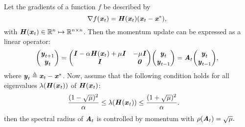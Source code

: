 \begin{lemma}
\label{lem:robustness_general}
Let the gradients of a function $f$ be described by
\begin{equation}
	\nabla f(\bm{\mathit{x}}_t) = \bm{\mathit{H}}(\bm{\mathit{x}}_t) (\bm{\mathit{x}}_t - \bm{\mathit{x}}^*),
\end{equation}
with $\bm{\mathit{H}}(\bm{x}_t) \in \mathbb{R}^n \mapsto \mathbb{R}^{n\times n}$.
Then the momentum update can be expressed as a linear operator:
\begin{align}
{\begin{pmatrix}
\bm{\mathit{y}}_{t+1}\\
\bm{\mathit{y}}_t \\
\end{pmatrix}}
=
{\begin{pmatrix}
\bm{\mathit{I}}-\alpha \bm{\mathit{H}}(\bm{\mathit{x}}_t) + \mu \bm{\mathit{I}} & - \mu \bm{\mathit{I}} \\
\bm{\mathit{I}} & \bm{\mathit{0}} \\
\end{pmatrix}}
{\begin{pmatrix}
\bm{\mathit{y}}_t \\
\bm{\mathit{y}}_{t-1} \\
\end{pmatrix}}
=\bm{\mathit{A}}_t
{\begin{pmatrix}
\bm{\mathit{y}}_t \\
\bm{\mathit{y}}_{t-1} \\
\end{pmatrix}},
\end{align}
where $\bm{\mathit{y}}_t\triangleq \bm{\mathit{x}}_t - \bm{\mathit{x}}^*$.
Now, assume that the following condition holds for all eigenvalues $\lambda(\bm{\mathit{H}}(\bm{x}_t))$ of $\bm{\mathit{H}}(\bm{x}_t)$:
\begin{align}
{(1-\sqrt{\mu})^2\over \alpha} &\leq \lambda(\bm{\mathit{H}}(\bm{x}_t)) \leq {(1+\sqrt{\mu})^2\over \alpha}.
\label{equ:control_condition}
\end{align}
then the spectral radius of $\bm{\mathit{A}}_t$ is controlled by momentum with
$	\rho(\bm{\mathit{A}}_t) = \sqrt{\mu}.$


\end{lemma}

